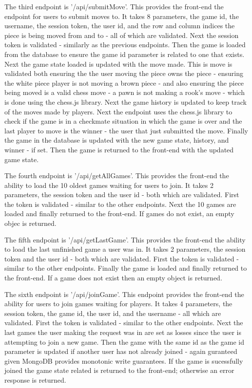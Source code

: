 \documentclass[12pt]{article}
\begin{document}
The third endpoint is '/api/submitMove'. This provides the front-end the endpoint for users to submit moves to. It takes 8 parameters, the game id, the username, the session token, the user id, and the row and column indices the piece is being moved from and to -  all of which are validated. Next the session token is validated - similarly as the previous endpoints. Then the game is loaded from the database to ensure the game id parameter is related to one that exists. Next the game state loaded is updated with the move made. This is move is validated both ensuring the the user moving the piece owns the piece - ensuring the white piece player is not moving a brown piece - and also ensuring the piece being moved is a valid chess move - a pawn is not making a rook's move - which is done using the chess.js library. Next the game history is updated to keep track of the moves made by players. Next the endpoint uses the chess.js library to check if the game is in a checkmate situation in which the game is over and the last player to move is the winner - the user that just submitted the move. Finally the game in the database is updated with the new game state, history, and winner - if set. Then the game is returned to the front-end with the updated game state.

The fourth endpoint is '/api/getAllGames'. This provides the front-end the ability to load the 10 oldest games waiting for users to join. It takes 2 parameters, the session token and the user id - both which are validated. First the token is validated - similar to the other endpoints. Next the 10 games are loaded and finally returned to the front-end. If games do not exist, an empty objec is returned.

The fifth endpoint is '/api/getLastGame'. This provides the front-end the ability to load the last unfinished game a user was in. It takes 2 parameters, the session token and the user id - both which are validated. First the token is validated - similar to the other endpoints. Finally the game is loaded and finally returned to the front-end. If a game does not exist then an empty object is returned.

The sixth endpoint is '/api/joinGame'. This endpoint provides the front-end the ability for users to join games waiting for players. It takes 4 parameters, the session token, the game id, the user id, and the username - all which are validated.  First the token is validated - similar to the other endpoints. Next the last games the user making the request was in are set as losses since the user is attempting to join a new game. Then the game with the same id as the game id parameter is updated if another user has not already joined - again guranteed given MongoDB provides monotonic write guarantees. If the game is sucessfully joined the game state related is returned to the front-end; otherwise an error response is returned.
\end{document}
